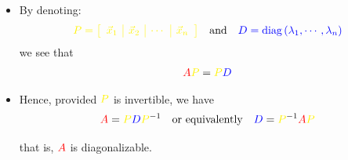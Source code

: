 \documentclass[pdf,9pt]{beamer}
\begin{document}
\begin{frame}[fragile]
\begin{emptytitle}
\begin{itemize}
    \item By denoting:
	\begin{align*}
	     \textcolor{yellow}{   P = \left[ \begin{array}{c|c|c|c} \vec{x}_1 &  \vec{x}_2  & \cdots &  \vec{x}_n \end{array} \right]}
	     \quad \mbox{and} \quad
	     \textcolor{blue}{D = \diag\left(\lambda_1,\cdots,\lambda_n\right)}
	\end{align*}
	we see that
	\begin{align*}
	    \textcolor{red}{A} \textcolor{yellow}{P} = \textcolor{yellow}{P} \textcolor{blue}{D}
	\end{align*}
	\vspace{4em}
	\pause

    \item Hence, provided $ \textcolor{yellow}{P}$ is invertible, we have \\[0.5em]
	\begin{align*}
	    \textcolor{red}{A}  = \textcolor{yellow}{P} \textcolor{blue}{D}\textcolor{yellow}{P}^{-1}
	    \quad\text{or equivalently}\quad
	    \textcolor{blue}{D}  = \textcolor{yellow}{P}^{-1} \textcolor{red}{A} \textcolor{yellow}{P}\\[0.5em]
	\end{align*}
	\pause
	that is, $\textcolor{red}{A}$ is diagonalizable.
\end{itemize}
\end{emptytitle}
\end{frame}
\end{document}
